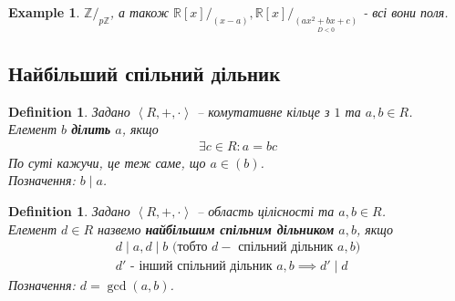 \documentclass[a4paper, 10pt]{article}
\theoremstyle{theoremdd}
\theoremstyle{theoremdd}
\newtheorem{definition}[theorem]{Definition}
\theoremstyle{theoremdd}
\theoremstyle{theoremdd}
\theoremstyle{theoremdd}
\newtheorem{example}[theorem]{Example}
\theoremstyle{theoremdd}
\theoremstyle{theoremdd}
\theoremstyle{theoremdd}
\theoremstyle{theoremdd}
\theoremstyle{theoremdd}
\theoremstyle{theoremdd}
\theoremstyle{theoremdd}
\theoremstyle{theoremdd}
\theoremstyle{theoremdd}
\theoremstyle{theoremdd}
\begin{document}
\begin{example}
$\mathbb{Z}/_{p\mathbb{Z}}$, а також $\mathbb{R}[x]/_{(x-a)}, \mathbb{R}[x]/_{\underset{D<0}{(ax^2+bx+c)}}$ - всі вони поля.
\end{example}

\subsection{Найбільший спільний дільник}
\begin{definition}
Задано $\left< R,+,\cdot\right>$ -- комутативне кільце з $1$ та $a,b \in R$.\\
Елемент $b$ \textbf{ділить} $a$, якщо
\begin{align*}
\exists c \in R: a = bc
\end{align*}
По суті кажучи, це теж саме, що $a \in (b)$.\\
Позначення: $b \mid a$.
\end{definition}

\begin{definition}
Задано $\left< R,+,\cdot\right>$ -- область цілісності та $a,b \in R$.\\
Елемент $d \in R$ назвемо \textbf{найбільшим спільним дільником} $a,b$, якщо
\begin{align*}
d \mid a, d \mid b \text{ (тобто } d - \text{ спільний дільник } a,b\text{)}\\
d' \text{ - інший спільний дільник } a,b \implies d' \mid d
\end{align*}
Позначення: $d = \gcd(a,b)$.
\end{definition}
\end{document}
